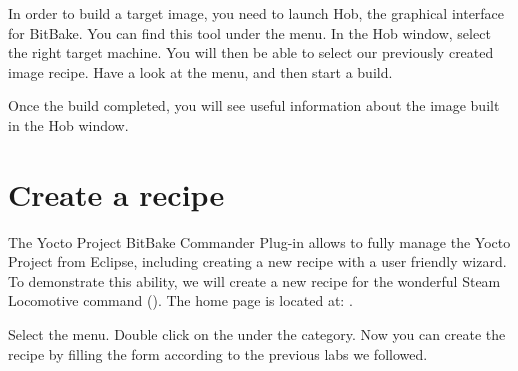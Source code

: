 In order to build a target image, you need to launch Hob, the graphical
interface for BitBake. You can find this tool under the  menu. In
the Hob window, select the right target machine. You will then be able to select
our previously created image recipe. Have a look at the  menu, and then start a build.

Once the build completed, you will see useful information about the image built
in the Hob window.

\section{Create a recipe}

The Yocto Project BitBake Commander Plug-in allows to fully manage the Yocto Project
from Eclipse, including creating a new recipe with a user friendly wizard. To
demonstrate this ability, we will create a new recipe for the wonderful Steam
Locomotive command (). The home page is located at:
.

Select the  menu. Double click on the  under the  category. Now you can
create the recipe by filling the form according to the previous labs we
followed.
